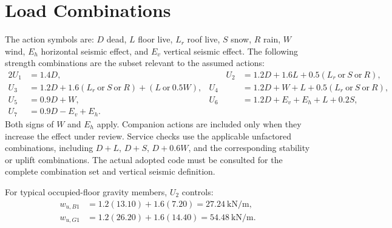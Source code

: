\section{Load Combinations}

The action symbols are: $D$ dead, $L$ floor live, $L_r$ roof live, $S$ snow, $R$
rain, $W$ wind, $E_h$ horizontal seismic effect, and $E_v$ vertical seismic effect.
The following strength combinations are the subset relevant to the assumed actions:
\begin{alignat}{2}
  U_1 &= 1.4D, &\qquad
  U_2 &= 1.2D+1.6L+0.5(L_r\ \text{or}\ S\ \text{or}\ R),\\
  U_3 &= 1.2D+1.6(L_r\ \text{or}\ S\ \text{or}\ R)+(L\ \text{or}\ 0.5W),&
  U_4 &= 1.2D+W+L+0.5(L_r\ \text{or}\ S\ \text{or}\ R),\\
  U_5 &= 0.9D+W,&
  U_6 &= 1.2D+E_v+E_h+L+0.2S,\\
  U_7 &= 0.9D-E_v+E_h.&&
\end{alignat}
Both signs of $W$ and $E_h$ apply. Companion actions are included only when they
increase the effect under review. Service checks use the applicable unfactored
combinations, including $D+L$, $D+S$, $D+0.6W$, and the corresponding stability or
uplift combinations. The actual adopted code must be consulted for the complete
combination set and vertical seismic definition.

For typical occupied-floor gravity members, $U_2$ controls:
\begin{align}
  w_{u,B1} &= 1.2(13.10)+1.6(7.20)
             = \SI{27.24}{\kilo\newton\per\metre},\\
  w_{u,G1} &= 1.2(26.20)+1.6(14.40)
             = \SI{54.48}{\kilo\newton\per\metre}.
\end{align}

